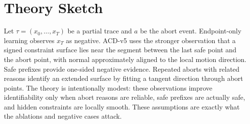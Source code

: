 \documentclass{article}
\begin{document}
\section{Theory Sketch}
Let $\tau=(x_0,\ldots,x_T)$ be a partial trace and $a$ be the abort event.  Endpoint-only learning observes $x_T$ as negative.  ACD-v5 uses the stronger observation that a signed constraint surface lies near the segment between the last safe point and the abort point, with normal approximately aligned to the local motion direction.  Safe prefixes provide one-sided negative evidence.  Repeated aborts with related reasons identify an extended surface by fitting a tangent direction through abort points.  The theory is intentionally modest: these observations improve identifiability only when abort reasons are reliable, safe prefixes are actually safe, and hidden constraints are locally smooth.  These assumptions are exactly what the ablations and negative cases attack.
\end{document}
